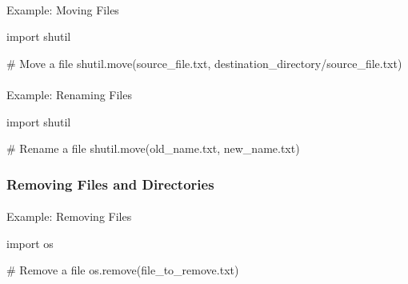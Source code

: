 \documentclass[
  letterpaper,
  DIV=11,
  numbers=noendperiod]{scrreprt}
\makeatletter
\let\oldparagraph\paragraph
\renewcommand{\paragraph}{
    \@ifstar
      \xxxParagraphStar
      \xxxParagraphNoStar
  }
\newcommand{\xxxParagraphStar}[1]{\oldparagraph*{#1}\mbox{}}
\newcommand{\xxxParagraphNoStar}[1]{\oldparagraph{#1}\mbox{}}
\newenvironment{Shaded}{\begin{snugshade}}{\end{snugshade}}
\newcommand{\CommentTok}[1]{\textcolor[rgb]{0.37,0.37,0.37}{#1}}
\newcommand{\ImportTok}[1]{\textcolor[rgb]{0.00,0.46,0.62}{#1}}
\newcommand{\NormalTok}[1]{\textcolor[rgb]{0.00,0.23,0.31}{#1}}
\newcommand{\StringTok}[1]{\textcolor[rgb]{0.13,0.47,0.30}{#1}}
\makeatother
\begin{document}
\paragraph{Example: Moving Files}\label{example-moving-files}

\begin{Shaded}
\begin{Highlighting}[]
\ImportTok{import}\NormalTok{ shutil}

\CommentTok{\# Move a file}
\NormalTok{shutil.move(}\StringTok{\textquotesingle{}source\_file.txt\textquotesingle{}}\NormalTok{, }\StringTok{\textquotesingle{}destination\_directory/source\_file.txt\textquotesingle{}}\NormalTok{)}
\end{Highlighting}
\end{Shaded}

\paragraph{Example: Renaming Files}\label{example-renaming-files}

\begin{Shaded}
\begin{Highlighting}[]
\ImportTok{import}\NormalTok{ shutil}

\CommentTok{\# Rename a file}
\NormalTok{shutil.move(}\StringTok{\textquotesingle{}old\_name.txt\textquotesingle{}}\NormalTok{, }\StringTok{\textquotesingle{}new\_name.txt\textquotesingle{}}\NormalTok{)}
\end{Highlighting}
\end{Shaded}

\subsubsection{Removing Files and
Directories}\label{removing-files-and-directories}

\paragraph{Example: Removing Files}\label{example-removing-files}

\begin{Shaded}
\begin{Highlighting}[]
\ImportTok{import}\NormalTok{ os}

\CommentTok{\# Remove a file}
\NormalTok{os.remove(}\StringTok{\textquotesingle{}file\_to\_remove.txt\textquotesingle{}}\NormalTok{)}
\end{Highlighting}
\end{Shaded}
\end{document}
